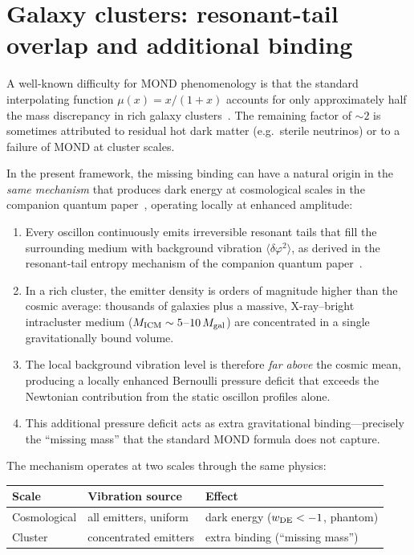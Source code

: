 \documentclass[11pt]{article}
\begin{document}
\section{Galaxy clusters: resonant-tail overlap and additional binding}\label{sec:cluster_binding}

A well-known difficulty for MOND phenomenology is that the
standard interpolating function $\mu(x)=x/(1+x)$ accounts for
only approximately half the mass discrepancy in rich galaxy
clusters~\cite{Sanders2003,Angus2008}.  The remaining factor of
$\sim\!2$ is sometimes attributed to residual hot dark matter
(e.g.\ sterile neutrinos) or to a failure of MOND at cluster
scales.

In the present framework, the missing binding can have a natural
origin in the \emph{same mechanism} that produces dark energy
at cosmological scales in the companion quantum paper~\cite{Lotishvili2026Q}, operating locally at enhanced
amplitude:

\begin{enumerate}
  \item Every oscillon continuously emits irreversible resonant
    tails that fill the surrounding medium with background
    vibration $\langle\delta\varphi^2\rangle$, as derived in the
    resonant-tail entropy mechanism of the companion quantum paper~\cite{Lotishvili2026Q}.
  \item In a rich cluster, the emitter density is orders of
    magnitude higher than the cosmic average: thousands of
    galaxies plus a massive, X-ray--bright intracluster medium
    ($M_{\rm ICM} \sim 5$--$10\,M_{\rm gal}$) are concentrated
    in a single gravitationally bound volume.
  \item The local background vibration level is therefore
    \emph{far above} the cosmic mean, producing a locally
    enhanced Bernoulli pressure deficit that exceeds the
    Newtonian contribution from the static oscillon profiles
    alone.
  \item This additional pressure deficit acts as extra
    gravitational binding---precisely the ``missing mass'' that
    the standard MOND formula does not capture.
\end{enumerate}

The mechanism operates at two scales through the same physics:
\begin{center}
\begin{tabular}{lll}
\toprule
\textbf{Scale} & \textbf{Vibration source} & \textbf{Effect} \\
\midrule
Cosmological & all emitters, uniform & dark energy ($w_{\rm DE} < -1$, phantom) \\
Cluster & concentrated emitters & extra binding (``missing mass'') \\
\bottomrule
\end{tabular}
\end{center}
\end{document}
